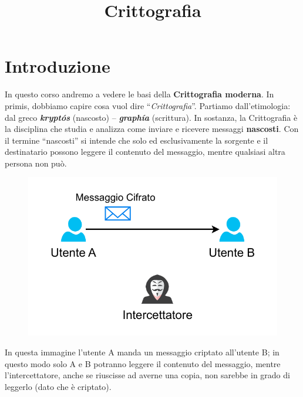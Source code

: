 \documentclass{rapport}
\title{Crittografia} %
\begin{document}

\subject{Sistemi e Reti} %



        
\buildmargins %
\buildcover %
\toc %


\section{Introduzione}

In questo corso andremo a vedere le basi della \textbf{Crittografia moderna}. In primis, dobbiamo capire cosa vuol dire “\textit{Crittografia}”. Partiamo dall’etimologia: dal greco \textbf{\textit{kryptós}} (nascosto) – \textbf{\textit{graphía}} (scrittura). In sostanza, la Crittografia è la disciplina che studia e analizza come inviare e ricevere messaggi \textbf{nascosti}. Con il termine “nascosti” si intende che solo ed esclusivamente la sorgente e il destinatario possono leggere il contenuto del messaggio, mentre qualsiasi altra persona non può.

\begin{figure}[h]
     \centering
    \includegraphics[width=0.6\linewidth]{logos/0_1_cripto.pdf}
\end{figure}

In questa immagine l'utente A manda un messaggio criptato all’utente B; in questo modo solo A e B potranno leggere il contenuto del messaggio, mentre l’intercettatore, anche se riuscisse ad averne una copia, non sarebbe in grado di leggerlo (dato che è criptato).
\end{document}
